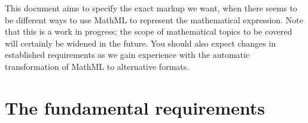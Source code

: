 \documentclass[english,a4paper,11pt]{article}
\begin{document}
\bigskip

This document aims to specify the exact markup we want, when there seems to be different ways to use MathML to represent the mathematical expression. Note that this is a work in progress; the scope of mathematical topics to be covered will certainly be widened in the future. You should also expect changes in established requirements as we gain experience with the automatic transformation of MathML to alternative formats.



\section{The fundamental requirements}
\end{document}
